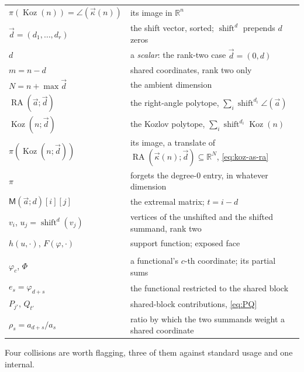 \documentclass[11pt, a4paper, abstract=yes]{scrartcl}
\theoremstyle{definition}
\theoremstyle{remark}
\theoremstyle{plain}
\newcommand{\Koz}{\operatorname{Koz}}
\newcommand{\shift}{\operatorname{shift}}
\newcommand{\rasimp}{\angle}
\newcommand{\RA}{\operatorname{RA}}
\newcommand{\kozvec}{\vec\kappa}
\newcommand{\extten}{\mathsf{M}}
\newcommand{\proj}{\pi}
\begin{document}
\begin{center}
\begin{tabular}{@{}ll@{}}
  \(\proj(\Koz(n))=\rasimp(\kozvec(n))\) & its image in \(\mathbb R^n\) \\
  \(\vec d=(d_1,\dots,d_r)\)   & the shift vector, sorted; \(\shift^d\) prepends \(d\) zeros \\
  \(d\)                        & a \emph{scalar}: the rank-two case \(\vec d=(0,d)\) \\
  \(m=n-d\)                    & shared coordinates, rank two only \\
  \(N=n+\max\vec d\)           & the ambient dimension \\
  \(\RA(\vec a;\vec d)\)       & the right-angle polytope, \(\sum_i\shift^{d_i}\rasimp(\vec a)\) \\
  \(\Koz(n;\vec d)\) & the Kozlov polytope, \(\sum_i\shift^{d_i}\Koz(n)\) \\
  \(\proj(\Koz(n;\vec d))\) & its image, a translate of \(\RA(\kozvec(n);\vec d)\subseteq\mathbb R^N\), \eqref{eq:koz-as-ra} \\
  \(\proj\)                     & forgets the degree-\(0\) entry, in whatever dimension \\
  \(\extten(\vec a;d)[i][j]\)       & the extremal matrix; \(t=i-d\) \\
  \(v_i\), \(u_j=\shift^d(v_j)\) & vertices of the unshifted and the shifted summand, rank two \\
  \(h(u,\cdot)\), \(F(\varphi,\cdot)\) & support function; exposed face \\
  \addlinespace
  \multicolumn{2}{@{}l}{\emph{Appendix~\ref{sec:app} only}}\\
  \(\varphi_c\), \(\Phi\)      & a functional's \(c\)-th coordinate; its partial sums \\
  \(e_s=\varphi_{d+s}\)        & the functional restricted to the shared block \\
  \(P_{j'}\), \(Q_{t'}\)       & shared-block contributions, \eqref{eq:PQ} \\
  \(\rho_s=a_{d+s}/a_s\)       & ratio by which the two summands weight a shared coordinate \\
  \bottomrule
\end{tabular}
\end{center}
\endgroup

Four collisions are worth flagging, three of them against standard usage and one internal.
\end{document}
